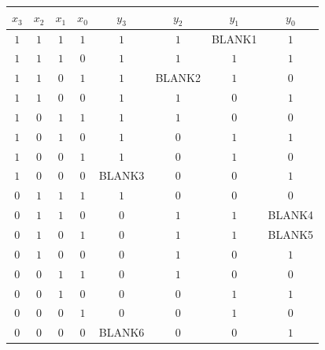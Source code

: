 \documentclass[12pt, oneside]{article}
\begin{document}
\begin{enumerate}[labelindent=0pt, leftmargin=0pt]
\begin{enumerate}
        \begin{center}
        \begin{tabular}{cccc|cccc}
        $x_3$ & $x_2$ & $x_1$ & $x_0$ & $y_3$ & $y_2$ & $y_1$ & $y_0$\\
        \hline
        $1$ & $1$ & $1$ & $1$ & $1$ & $1$ & BLANK1 & $1$\\
        $1$ & $1$ & $1$ & $0$ & $1$ & $1$ & $1$ & $1$\\
        $1$ & $1$ & $0$ & $1$ & $1$ & BLANK2 & $1$ & $0$\\
        $1$ & $1$ & $0$ & $0$ & $1$ & $1$ & $0$ & $1$\\
        $1$ & $0$ & $1$ & $1$ & $1$ & $1$ & $0$ & $0$\\
        $1$ & $0$ & $1$ & $0$ & $1$ & $0$ & $1$ & $1$\\
        $1$ & $0$ & $0$ & $1$ & $1$ & $0$ & $1$ & $0$\\
        $1$ & $0$ & $0$ & $0$ & BLANK3& $0$ & $0$ & $1$\\
        $0$ & $1$ & $1$ & $1$ & $1$ & $0$ & $0$ & $0$\\
        $0$ & $1$ & $1$ & $0$ & $0$ & $1$ & $1$ & BLANK4\\
        $0$ & $1$ & $0$ & $1$ & $0$ & $1$ & $1$ & BLANK5\\
        $0$ & $1$ & $0$ & $0$ & $0$ & $1$ & $0$ & $1$\\
        $0$ & $0$ & $1$ & $1$ & $0$ & $1$ & $0$ & $0$\\
        $0$ & $0$ & $1$ & $0$ & $0$ & $0$ & $1$ & $1$\\
        $0$ & $0$ & $0$ & $1$ & $0$ & $0$ & $1$ & $0$\\
        $0$ & $0$ & $0$ & $0$ & BLANK6 & $0$ & $0$ & $1$\\
        \end{tabular}
        \end{center}
  

\end{enumerate}
\end{enumerate}
\end{document}
